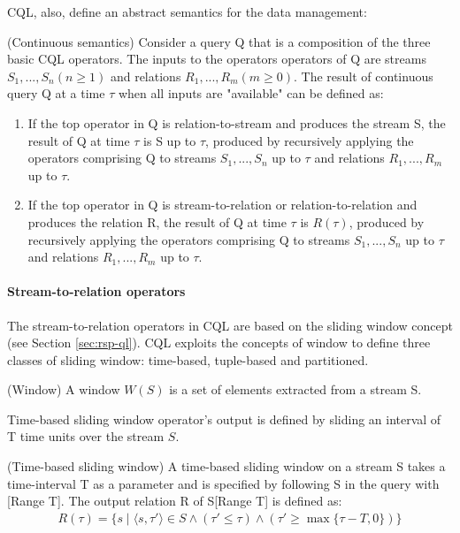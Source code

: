 CQL, also, define an abstract semantics for the data management:
\begin{Definition}
(Continuous semantics) Consider a query Q that is a composition of the three basic CQL operators. 
The inputs to the operators operators of Q are streams $S_1, ..., S_n (n \geq 1)$ and relations $R_1,..., R_m (m \geq 0)$. 
The result of continuous query Q at a time $\tau$ when all inputs are "available" can be defined as:
\begin{enumerate}
\item If the top operator in Q is relation-to-stream and produces the stream S, the result of Q at time $\tau$ is S up to $\tau$, produced by recursively applying the operators comprising Q to streams $S_1, ..., S_n$ up to $\tau$ and relations $R_1,..., R_m$ up to $\tau$.
\item If the top operator in Q is stream-to-relation or relation-to-relation and produces the relation R, the result of Q at time $\tau$ is $R(\tau)$, produced by recursively applying the operators comprising Q to streams $S_1, ..., S_n$ up to $\tau$ and relations $R_1,..., R_m$ up to $\tau$.
\end{enumerate}
\end{Definition}

\paragraph{Stream-to-relation operators}
The stream-to-relation operators in CQL are based on the sliding window concept (see Section \ref{sec:rsp-ql}). CQL exploits the concepts of window to define three classes of sliding window: time-based, tuple-based and partitioned.

\begin{Definition}
(Window) A window $W(S)$ is a set of elements extracted from a stream S. 
\end{Definition}

Time-based sliding window operator's output is defined by sliding an interval of T time units over the stream $S$. 
\begin{Definition}
(Time-based sliding window) A time-based sliding window on a stream S takes a time-interval T as a parameter and is specified by following S in the query with [Range T].
The output relation R of S[Range T] is defined as:
\noindent\begin{align*}
R(\tau)=\{s \mid \langle s,\tau' \rangle \in S \wedge (\tau' \leq \tau) \wedge (\tau' \geq \max\{\tau - T,0\})\}
\end{align*}  
\end{Definition}

